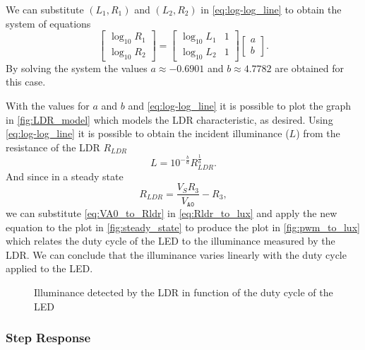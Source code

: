 We can substitute $(L_1, R_1)$ and $(L_2, R_2)$ in \eqref{eq:log-log_line} to obtain the system of equations
\begin{equation} \label{eq:log-log_line_system}
    \begin{bmatrix}
	\log_{10}R_1 \\ \log_{10}R_2
    \end{bmatrix}
    =
    \begin{bmatrix}
	\log_{10}L_1  &  1 \\
	\log_{10}L_2  &  1
    \end{bmatrix}
    \begin{bmatrix}
	a \\ b
    \end{bmatrix}.
\end{equation}
By solving the system the values $a \approx -0.6901$ and $b \approx 4.7782$ are obtained for this case.

With the values for $a$ and $b$ and \eqref{eq:log-log_line} it is possible to plot the graph in \autoref{fig:LDR_model} which models the LDR characteristic, as desired. Using \eqref{eq:log-log_line} it is possible to obtain the incident illuminance ($L$) from the resistance of the LDR $R_{LDR}$
\begin{equation} \label{eq:Rldr_to_lux}
    L = 10^{-\frac{b}{a}} R_{LDR}^{\frac{1}{a}} .
\end{equation}
And since in a steady state
\begin{equation} \label{eq:VA0_to_Rldr}
    R_{LDR} = \frac{V_S R_3}{V_{\texttt{A0}}} - R_3 ,
\end{equation}
we can substitute \eqref{eq:VA0_to_Rldr} in \eqref{eq:Rldr_to_lux} and apply the new equation to the plot in \autoref{fig:steady_state} to produce the plot in \autoref{fig:pwm_to_lux} which relates the duty cycle of the LED to the illuminance measured by the LDR. We can conclude that the illuminance varies linearly with the duty cycle applied to the LED.

\begin{figure}[h]
    \centering
    \resizebox{0.75\textwidth}{!}{}
    \caption{Illuminance detected by the LDR in function of the duty cycle of the LED}
    \label{fig:pwm_to_lux}
\end{figure}


\subsubsection{Step Response}
\label{sub:StepResponse}

